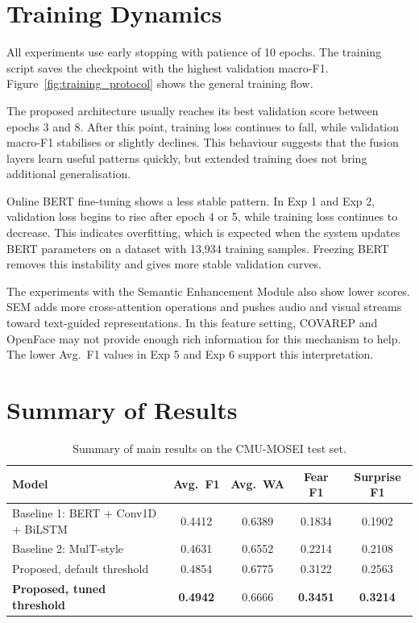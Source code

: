\section{Training Dynamics}
\label{sec:training_dynamics}

All experiments use early stopping with patience of 10 epochs. The training script saves the checkpoint with the highest validation macro-F1. Figure~\ref{fig:training_protocol} shows the general training flow.

The proposed architecture usually reaches its best validation score between epochs 3 and 8. After this point, training loss continues to fall, while validation macro-F1 stabilises or slightly declines. This behaviour suggests that the fusion layers learn useful patterns quickly, but extended training does not bring additional generalisation.

Online BERT fine-tuning shows a less stable pattern. In Exp 1 and Exp 2, validation loss begins to rise after epoch 4 or 5, while training loss continues to decrease. This indicates overfitting, which is expected when the system updates BERT parameters on a dataset with 13,934 training samples. Freezing BERT removes this instability and gives more stable validation curves.

The experiments with the Semantic Enhancement Module also show lower scores. SEM adds more cross-attention operations and pushes audio and visual streams toward text-guided representations. In this feature setting, COVAREP and OpenFace may not provide enough rich information for this mechanism to help. The lower Avg.~F1 values in Exp 5 and Exp 6 support this interpretation.

\section{Summary of Results}
\label{sec:summary_results}

\begin{table}[H]
\centering
\caption{Summary of main results on the CMU-MOSEI test set.}
\label{tab:summary}
\begin{tabular}{lcccc}
\hline
\textbf{Model} & \textbf{Avg.~F1} & \textbf{Avg.~WA} & \textbf{Fear F1} & \textbf{Surprise F1} \\
\hline
Baseline 1: BERT + Conv1D + BiLSTM       & 0.4412 & 0.6389 & 0.1834 & 0.1902 \\
Baseline 2: MulT-style         & 0.4631 & 0.6552 & 0.2214 & 0.2108 \\
Proposed, default threshold    & 0.4854 & 0.6775 & 0.3122 & 0.2563 \\
\textbf{Proposed, tuned threshold} & \textbf{0.4942} & 0.6666 & \textbf{0.3451} & \textbf{0.3214} \\
\hline
\end{tabular}
\end{table}

